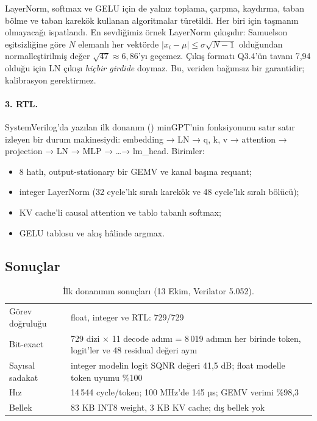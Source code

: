 LayerNorm, softmax ve GELU için de yalnız toplama, çarpma, kaydırma, taban bölme ve taban karekök kullanan algoritmalar türetildi. Her biri için taşmanın olmayacağı ispatlandı. En sevdiğimiz örnek LayerNorm çıkışıdır: Samuelson eşitsizliğine göre $N$ elemanlı her vektörde $|x_i-\mu|\le\sigma\sqrt{N-1}$ olduğundan normalleştirilmiş değer $\sqrt{47}\approx 6{,}86$'yı geçemez. Çıkış formatı Q3.4'ün tavanı 7,94 olduğu için LN çıkışı \emph{hiçbir girdide} doymaz. Bu, veriden bağımsız bir garantidir; kalibrasyon gerektirmez.

\paragraph{3. RTL.} SystemVerilog'da yazılan ilk donanım () minGPT'nin  fonksiyonunu satır satır izleyen bir durum makinesiydi: embedding → LN → q, k, v → attention → projection → LN → MLP → \dots → lm\_head. Birimler:
\begin{itemize}
  \item 8 hatlı, output-stationary bir GEMV ve kanal başına requant;
  \item integer LayerNorm (32 cycle'lık sıralı karekök ve 48 cycle'lık sıralı bölücü);
  \item KV cache'li causal attention ve tablo tabanlı softmax;
  \item GELU tablosu ve akış hâlinde argmax.
\end{itemize}

\subsection*{Sonuçlar}
\begin{table}[htb]
\centering\small
\caption{İlk donanımın sonuçları (13 Ekim, Verilator 5.052).}\label{tab:e1}
\begin{tabularx}{0.86\textwidth}{@{}lL@{}}
\toprule
{} &  \\
\midrule
Görev doğruluğu & float, integer ve RTL: 729/729 \\
Bit-exact & 729 dizi × 11 decode adımı = 8\,019 adımın her birinde token, logit'ler ve 48 residual değeri aynı \\
Sayısal sadakat & integer modelin logit SQNR değeri 41,5 dB; float modelle token uyumu \%100 \\
Hız & 14\,544 cycle/token; 100 MHz'de 145 µs; GEMV verimi \%98,3 \\
Bellek & 83 KB INT8 weight, 3 KB KV cache; dış bellek yok \\
\bottomrule
\end{tabularx}
\end{table}

